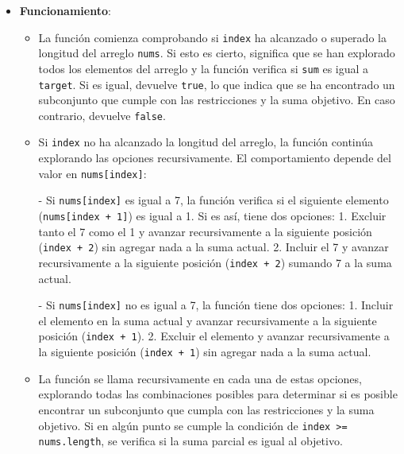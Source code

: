 \documentclass{article}
\begin{document}
\begin{enumerate}
\begin{itemize}
  \item \textbf{Funcionamiento}:
    \begin{itemize}
      \item La función comienza comprobando si \texttt{index} ha alcanzado o superado la longitud del arreglo \texttt{nums}. Si esto es cierto, significa que se han explorado todos los elementos del arreglo y la función verifica si \texttt{sum} es igual a \texttt{target}. Si es igual, devuelve \texttt{true}, lo que indica que se ha encontrado un subconjunto que cumple con las restricciones y la suma objetivo. En caso contrario, devuelve \texttt{false}.
      
      \item Si \texttt{index} no ha alcanzado la longitud del arreglo, la función continúa explorando las opciones recursivamente. El comportamiento depende del valor en \texttt{nums[index]}:
      
        - Si \texttt{nums[index]} es igual a 7, la función verifica si el siguiente elemento (\texttt{nums[index + 1]}) es igual a 1. Si es así, tiene dos opciones:
          1. Excluir tanto el 7 como el 1 y avanzar recursivamente a la siguiente posición (\texttt{index + 2}) sin agregar nada a la suma actual.
          2. Incluir el 7 y avanzar recursivamente a la siguiente posición (\texttt{index + 2}) sumando 7 a la suma actual.
        
        - Si \texttt{nums[index]} no es igual a 7, la función tiene dos opciones:
          1. Incluir el elemento en la suma actual y avanzar recursivamente a la siguiente posición (\texttt{index + 1}).
          2. Excluir el elemento y avanzar recursivamente a la siguiente posición (\texttt{index + 1}) sin agregar nada a la suma actual.
    
    \item La función se llama recursivamente en cada una de estas opciones, explorando todas las combinaciones posibles para determinar si es posible encontrar un subconjunto que cumpla con las restricciones y la suma objetivo. Si en algún punto se cumple la condición de \texttt{index >= nums.length}, se verifica si la suma parcial es igual al objetivo.
    
    \end{itemize}
\end{itemize}
\end{enumerate}


\end{document}
